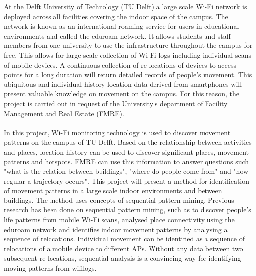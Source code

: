 At the Delft University of Technology (TU Delft) a large scale Wi-Fi network is deployed across all facilities covering the indoor space of the campus. The network is known as an international roaming service for users in educational environments and called the eduroam network. It allows students and staff members from one university to use the infrastructure throughout the campus for free. This allows for large scale collection of Wi-Fi logs including individual scans of mobile devices.  A continuous collection of re-locations of devices to access points for a long duration will return detailed records of people’s movement. This ubiquitous and individual history location data derived from smartphones will present valuable knowledge on movement on the campus. For this reason, the project is carried out in request of the University’s department of Facility Management and Real Estate (FMRE).\\\\
In this project, Wi-Fi monitoring technology is used to discover movement
patterns on the campus of TU Delft. Based on the relationship between activities and places, location history can be used to discover significant places, movement patterns and hotspots. FMRE can use this information to answer questions such "what is the relation between buildings", "where do people come from" and "how regular a trajectory occurs". This project will present a method for identification of movement patterns in a large scale indoor environments and between buildings. The method uses concepts of sequential pattern mining. Previous research has been done on sequential pattern mining, such as \cite{zhao2014discovering} to discover people’s life patterns from mobile Wi-Fi scans, \cite{meneses2012large} analysed place connectivity using the eduroam network and \cite{radaelli2013identifying} identifies indoor movement patterns by analysing a sequence of relocations. Individual movement can be identified as a sequence of relocations of a mobile device to different APs. Without any data between two subsequent re-locations, sequential analysis is a convincing way for identifying moving patterns from wifilogs.
